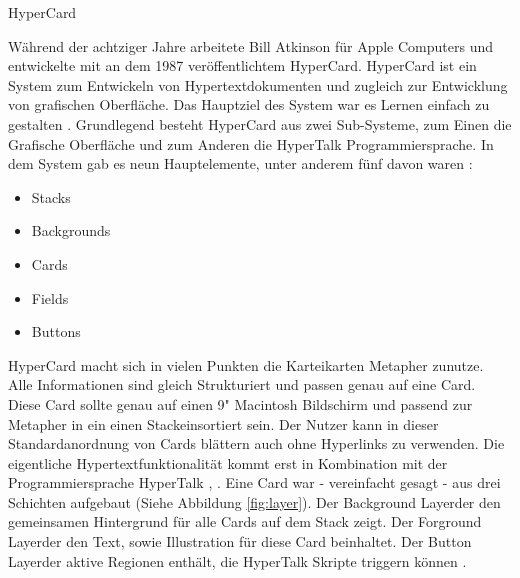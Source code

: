 \begin{section}{HyperCard}
\label{sec:hypercard}

Während der achtziger Jahre arbeitete Bill Atkinson für Apple Computers und entwickelte mit an dem 1987 veröffentlichtem HyperCard. HyperCard ist ein System zum Entwickeln von Hypertextdokumenten und zugleich zur Entwicklung von grafischen Oberfläche. Das Hauptziel des System war es Lernen einfach zu gestalten \cite{Nielsen1991}. Grundlegend besteht HyperCard aus zwei Sub-Systeme, zum Einen die Grafische Oberfläche und zum Anderen die HyperTalk Programmiersprache. In dem System gab es neun \glqq Hauptelemente\grqq, unter anderem fünf davon waren \cite{Goodman1988}:

\begin{itemize}
\item Stacks
\item Backgrounds
\item Cards
\item Fields
\item Buttons
\end{itemize}

HyperCard macht sich in vielen Punkten die Karteikarten Metapher zunutze. Alle Informationen sind gleich Strukturiert und passen genau auf eine Card. Diese Card sollte genau auf einen 9" Macintosh Bildschirm und passend zur Metapher in ein einen \glqq Stack\grqq{ }einsortiert sein. Der Nutzer kann in dieser Standardanordnung von Cards blättern auch ohne Hyperlinks zu verwenden. Die eigentliche Hypertextfunktionalität kommt erst in Kombination mit der Programmiersprache HyperTalk \cite{Goodman1988}, \cite{Nielsen1991}. Eine Card war - vereinfacht gesagt - aus drei Schichten aufgebaut (Siehe Abbildung \ref{fig:layer}). Der \glqq Background Layer\grqq{ }der den gemeinsamen Hintergrund für alle Cards auf dem Stack zeigt. Der \glqq Forground Layer\grqq{ }der den Text, sowie Illustration für diese Card beinhaltet. Der \glqq Button Layer\grqq{ }der aktive Regionen enthält, die HyperTalk Skripte triggern können \cite{Nielsen1995}.


\end{section}
